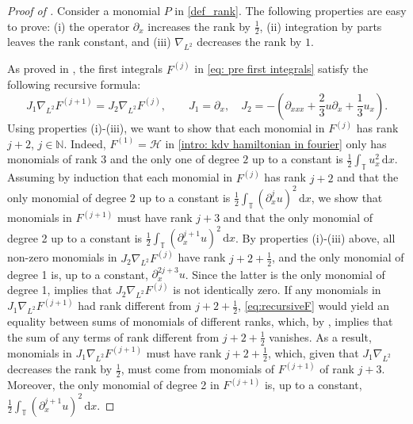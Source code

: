 \documentclass[a4paper,10pt,reqno]{article}
\theoremstyle{definition}
\theoremstyle{plain}
\theoremstyle{plain}
\theoremstyle{definition}
\theoremstyle{plain}
\theoremstyle{plain}
\theoremstyle{plain}
\theoremstyle{definition}
\theoremstyle{definition}
\def \N{\mathbb N}
\def \pa{{\partial}}
\def \T{\mathbb{T}}
\def \H{\mathcal{H}}
\begin{document}
\begin{proof}[Proof of ]
Consider a monomial $P$ in \eqref{def_rank}.
The following properties are easy to prove: (i) the operator $\pa_x$ increases the rank by $\frac{1}{2}$, (ii) integration by parts leaves the rank constant, and (iii) $\nabla_{L^2}$ decreases the rank by $1$.

\medskip

As proved in \cite{lax,magri}, the first integrals $F^{(j)}$ in \eqref{eq: pre first integrals} satisfy the following recursive formula:
\begin{equation}\label{eq:recursiveF}
J_1 \nabla_{L^2} F^{(j+1)} = J_2 \nabla_{L^2} F^{(j)}, \qquad J_1 = \pa_x, \quad J_2 =  -\left( \partial_{xxx} + \frac{2}{3} u \partial_x + \frac{1}{3} u_x \right).
\end{equation}
Using properties (i)-(iii), we want to show that each monomial in $F^{(j)}$ has rank $j+2$, $j\in\N$. Indeed, $F^{(1)}=\H$ in \eqref{intro: kdv hamiltonian in fourier} only has monomials of rank 3 and the only one of degree $2$ up to a constant is $\frac{1}{2} \int_{\T} u_x^2 \, \mathrm{d}x$. 
Assuming by induction that each monomial in $F^{(j)}$ has rank $j+2$ and that the only monomial of degree $2$ up to a constant is $\frac{1}{2} \int_{\T} (\pa_x^j u)^2 \, \mathrm{d}x$, we show that monomials in $F^{(j+1)}$ must have rank $j+3$ and that the only monomial of degree 2 up to a constant is $\frac{1}{2} \int_{\T} (\pa_x^{j+1} u)^2 \, \mathrm{d}x$.
By properties (i)-(iii) above, all non-zero monomials in $J_2 \nabla_{L^2} F^{(j)}$ have rank $j+2+\frac{1}{2}$, and the only monomial of degree 1 is, up to a constant, $\pa_x^{2j+3} u$. 
Since the latter is the only monomial of degree 1,  implies that $J_2 \nabla_{L^2} F^{(j)}$ is not identically zero.
If any monomials in $J_1 \nabla_{L^2} F^{(j+1)}$ had rank different from $j+2+\frac{1}{2}$, \eqref{eq:recursiveF} would yield an equality between sums of monomials of different ranks, which,  by , implies that the sum of any terms of rank different from  $j+2+\frac{1}{2}$ vanishes. 
As a result, monomials in $J_1 \nabla_{L^2} F^{(j+1)}$ must have rank $j+2+\frac{1}{2}$, which, given that $J_1 \nabla_{L^2}$ decreases the rank by $\frac12$, must come from monomials of $F^{(j+1)}$ of rank $j+3$.
Moreover, the only monomial of degree 2 in $F^{(j+1)}$ is, up to a constant, $\frac{1}{2} \int_{\T} (\pa_x^{j+1} u)^2 \, \mathrm{d}x$.

\medskip


\end{proof}
\end{document}
